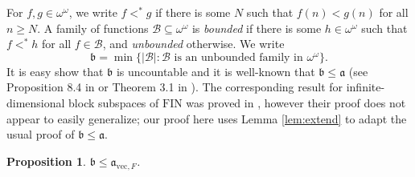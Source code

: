 \documentclass[11pt]{amsart}
\newcommand{\LB}{\mathcal{B}}
\renewcommand{\b}{\mathfrak{b}}
\renewcommand{\a}{\mathfrak{a}}
\newtheorem{prop}[thm]{Proposition}
\theoremstyle{definition}
\theoremstyle{remark}
\renewcommand{\1}{\mathbf{1}}
\newcommand{\FIN}{\mathrm{FIN}}
\begin{document}

For $f,g\in\omega^\omega$, we write $f<^*g$ if there is some $N$ such that $f(n)<g(n)$ for all $n\geq N$. A family of functions $\LB\subseteq\omega^\omega$ is \emph{bounded} if there is some $h\in\omega^\omega$ such that $f<^* h$ for all $f\in\LB$, and \emph{unbounded} otherwise. We write 
\[
	\b=\min\{|\LB|:\LB\text{ is an unbounded family in $\omega^\omega$}\}.
\]
It is easy show that $\b$ is uncountable and it is well-known that $\b\leq\a$ (see Proposition 8.4 in \cite{MR2768685} or Theorem 3.1 in \cite{MR776622}). The corresponding result for infinite-dimensional block subspaces of $\FIN$ was proved in \cite{MR3685044}, however their proof does not appear to easily generalize; our proof here uses Lemma \ref{lem:extend} to adapt the usual proof of $\b\leq\a$.

\begin{prop}\label{prop:bleqa}
	$\b\leq\a_{\mathrm{vec},F}$.
\end{prop}
\end{document}
